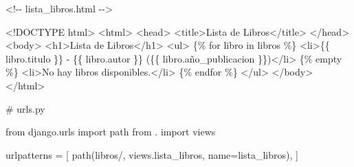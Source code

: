 \documentclass[
  a4paper,
  DIV=11,
  numbers=noendperiod,
  onepage,
  openany]{scrreprt}
\newenvironment{Shaded}{\begin{snugshade}}{\end{snugshade}}
\newcommand{\CommentTok}[1]{\textcolor[rgb]{0.37,0.37,0.37}{#1}}
\newcommand{\DataTypeTok}[1]{\textcolor[rgb]{0.68,0.00,0.00}{#1}}
\newcommand{\ImportTok}[1]{\textcolor[rgb]{0.00,0.46,0.62}{#1}}
\newcommand{\KeywordTok}[1]{\textcolor[rgb]{0.00,0.23,0.31}{#1}}
\newcommand{\NormalTok}[1]{\textcolor[rgb]{0.00,0.23,0.31}{#1}}
\newcommand{\OperatorTok}[1]{\textcolor[rgb]{0.37,0.37,0.37}{#1}}
\newcommand{\StringTok}[1]{\textcolor[rgb]{0.13,0.47,0.30}{#1}}
\begin{document}
\begin{Shaded}
\begin{Highlighting}[]
\CommentTok{\textless{}!{-}{-} lista\_libros.html {-}{-}\textgreater{}}

\DataTypeTok{\textless{}!DOCTYPE }\NormalTok{html}\DataTypeTok{\textgreater{}}
\DataTypeTok{\textless{}}\KeywordTok{html}\DataTypeTok{\textgreater{}}
\DataTypeTok{\textless{}}\KeywordTok{head}\DataTypeTok{\textgreater{}}
    \DataTypeTok{\textless{}}\KeywordTok{title}\DataTypeTok{\textgreater{}}\NormalTok{Lista de Libros}\DataTypeTok{\textless{}/}\KeywordTok{title}\DataTypeTok{\textgreater{}}
\DataTypeTok{\textless{}/}\KeywordTok{head}\DataTypeTok{\textgreater{}}
\DataTypeTok{\textless{}}\KeywordTok{body}\DataTypeTok{\textgreater{}}
    \DataTypeTok{\textless{}}\KeywordTok{h1}\DataTypeTok{\textgreater{}}\NormalTok{Lista de Libros}\DataTypeTok{\textless{}/}\KeywordTok{h1}\DataTypeTok{\textgreater{}}
    \DataTypeTok{\textless{}}\KeywordTok{ul}\DataTypeTok{\textgreater{}}
\NormalTok{        \{\% for libro in libros \%\}}
        \DataTypeTok{\textless{}}\KeywordTok{li}\DataTypeTok{\textgreater{}}\NormalTok{\{\{ libro.titulo \}\} {-} \{\{ libro.autor \}\} (\{\{ libro.año\_publicacion \}\})}\DataTypeTok{\textless{}/}\KeywordTok{li}\DataTypeTok{\textgreater{}}
\NormalTok{        \{\% empty \%\}}
        \DataTypeTok{\textless{}}\KeywordTok{li}\DataTypeTok{\textgreater{}}\NormalTok{No hay libros disponibles.}\DataTypeTok{\textless{}/}\KeywordTok{li}\DataTypeTok{\textgreater{}}
\NormalTok{        \{\% endfor \%\}}
    \DataTypeTok{\textless{}/}\KeywordTok{ul}\DataTypeTok{\textgreater{}}
\DataTypeTok{\textless{}/}\KeywordTok{body}\DataTypeTok{\textgreater{}}
\DataTypeTok{\textless{}/}\KeywordTok{html}\DataTypeTok{\textgreater{}}
\end{Highlighting}
\end{Shaded}

\begin{Shaded}
\begin{Highlighting}[]
\CommentTok{\# urls.py}

\ImportTok{from}\NormalTok{ django.urls }\ImportTok{import}\NormalTok{ path}
\ImportTok{from}\NormalTok{ . }\ImportTok{import}\NormalTok{ views}

\NormalTok{urlpatterns }\OperatorTok{=}\NormalTok{ [}
\NormalTok{    path(}\StringTok{\textquotesingle{}libros/\textquotesingle{}}\NormalTok{, views.lista\_libros, name}\OperatorTok{=}\StringTok{\textquotesingle{}lista\_libros\textquotesingle{}}\NormalTok{),}
\NormalTok{]}
\end{Highlighting}
\end{Shaded}
\end{document}
